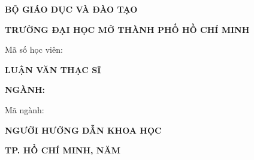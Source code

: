 \begin{titlepage}
\CoverOuterFrame
\thispagestyle{empty}
\begin{center}
{\bfseries BỘ GIÁO DỤC VÀ ĐÀO TẠO}\par
{\bfseries TRƯỜNG ĐẠI HỌC MỞ THÀNH PHỐ HỒ CHÍ MINH}\par
\vspace{0.8cm}

\par
\vspace{0.6cm}

{\bfseries\Large \ThesisAuthor}\par
{Mã số học viên: \StudentID}\par
\vspace{1.5cm}

{\bfseries\LARGE \ThesisTitle}\par
\vspace{1.3cm}

{\bfseries LUẬN VĂN THẠC SĨ}\par
{\bfseries NGÀNH: \Major}\par
{Mã ngành: \MajorCode}\par
\vspace{1.3cm}

\begin{flushright}
\begin{minipage}{0.55\textwidth}
\centering
\textbf{NGƯỜI HƯỚNG DẪN KHOA HỌC}\par
\vspace{0.3cm}
\textbf{\Supervisor}
\end{minipage}
\end{flushright}

\vfill
{\bfseries TP. HỒ CHÍ MINH, NĂM \ThesisYear}
\end{center}
\end{titlepage}

